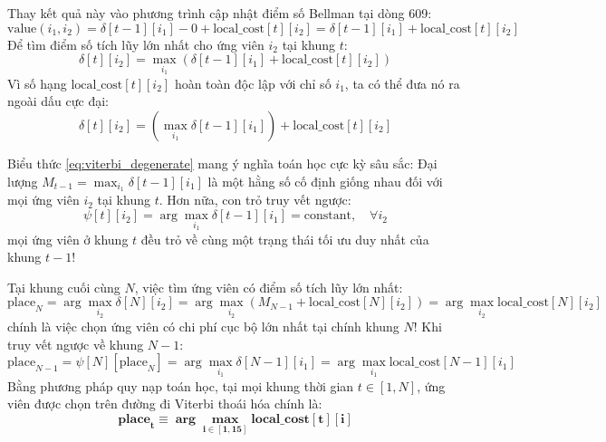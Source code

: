 Thay kết quả này vào phương trình cập nhật điểm số Bellman tại dòng 609:
\begin{equation}
    \text{value}(i_1, i_2) = \delta[t-1][i_1] - 0 + \text{local\_cost}[t][i_2] = \delta[t-1][i_1] + \text{local\_cost}[t][i_2]
\end{equation}
Để tìm điểm số tích lũy lớn nhất cho ứng viên $i_2$ tại khung $t$:
\begin{equation}
    \delta[t][i_2] = \max_{i_1} \left( \delta[t-1][i_1] + \text{local\_cost}[t][i_2] \right)
\end{equation}
Vì số hạng $\text{local\_cost}[t][i_2]$ hoàn toàn độc lập với chỉ số $i_1$, ta có thể đưa nó ra ngoài dấu cực đại:
\begin{equation}
    \delta[t][i_2] = \left( \max_{i_1} \delta[t-1][i_1] \right) + \text{local\_cost}[t][i_2]
    \label{eq:viterbi_degenerate}
\end{equation}

Biểu thức \eqref{eq:viterbi_degenerate} mang ý nghĩa toán học cực kỳ sâu sắc:
Đại lượng $M_{t-1} = \max_{i_1} \delta[t-1][i_1]$ là một hằng số cố định giống nhau đối với mọi ứng viên $i_2$ tại khung $t$. Hơn nữa, con trỏ truy vết ngược:
\begin{equation}
    \psi[t][i_2] = \arg\max_{i_1} \delta[t-1][i_1] = \text{constant}, \quad \forall i_2
\end{equation}
mọi ứng viên ở khung $t$ đều trỏ về cùng một trạng thái tối ưu duy nhất của khung $t-1$!

Tại khung cuối cùng $N$, việc tìm ứng viên có điểm số tích lũy lớn nhất:
\begin{equation}
    \text{place}_N = \arg\max_{i_2} \delta[N][i_2] = \arg\max_{i_2} \left( M_{N-1} + \text{local\_cost}[N][i_2] \right) = \arg\max_{i_2} \text{local\_cost}[N][i_2]
\end{equation}
chính là việc chọn ứng viên có chi phí cục bộ lớn nhất tại chính khung $N$!
Khi truy vết ngược về khung $N-1$:
\begin{equation}
    \text{place}_{N-1} = \psi[N][\text{place}_N] = \arg\max_{i_1} \delta[N-1][i_1] = \arg\max_{i_1} \text{local\_cost}[N-1][i_1]
\end{equation}
Bằng phương pháp quy nạp toán học, tại mọi khung thời gian $t \in [1, N]$, ứng viên được chọn trên đường đi Viterbi thoái hóa chính là:
\begin{equation}
    \mathbf{\text{place}_t \equiv \arg\max_{i \in [1, 15]} \text{local\_cost}[t][i]}
    \label{eq:argmax_equivalence}
\end{equation}

